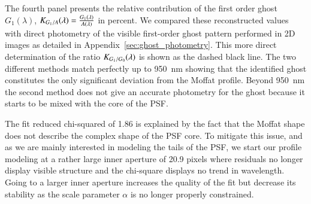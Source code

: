 The fourth panel presents the relative contribution of the first order
ghost $G_1(\lambda)$,
$K_{G_1/A}(\lambda) = \frac{G_1(\lambda)}{A(\lambda)}$ in
percent. We compared these reconstructed values with direct photometry
of the visible first-order ghost pattern performed in 2D images as
detailed in Appendix~\ref{sec:ghost_photometry}. This more direct
determination of the ratio $K_{G_1/G_0}(\lambda)$ is shown as the dashed black
line. The two different methods match perfectly up to \SI{950}{nm}
showing that the identified ghost constitutes the only significant
deviation from the Moffat profile. Beyond \SI{950}{nm} the second method
does not give an accurate photometry for the ghost because it starts
to be mixed with the core of the PSF.


The fit reduced chi-squared of 1.86 is explained by the fact that the Moffat
shape does not describe the complex shape of the PSF core. To mitigate this
issue, and as we are mainly interested in modeling the tails of the PSF, we
start our profile modeling at a rather large inner aperture of 20.9 pixels where
residuals no longer display visible structure and the chi-square displays no
trend in wavelength. Going to a larger inner aperture increases the quality of
the fit but decrease its stability as the scale parameter $\alpha$ is no longer
properly constrained.

